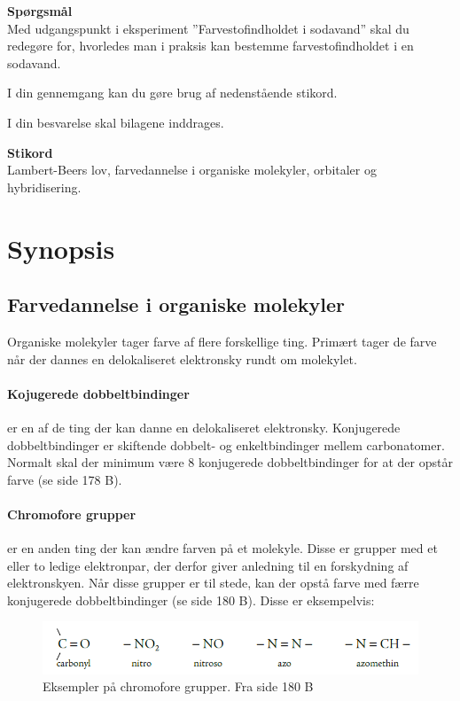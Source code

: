 \textbf{Spørgsmål}\\
Med udgangspunkt i eksperiment ”Farvestofindholdet i sodavand” skal du redegøre for, hvorledes man i praksis kan bestemme farvestofindholdet i en sodavand. 

I din gennemgang kan du gøre brug af nedenstående stikord. 

I din besvarelse skal bilagene inddrages.


\vspace{0.5 cm}
\textbf{Stikord}\\
Lambert-Beers lov, farvedannelse i organiske molekyler, orbitaler og hybridisering.

\section*{Synopsis}

\subsection{Farvedannelse i organiske molekyler}
Organiske molekyler tager farve af flere forskellige ting.
Primært tager de farve når der dannes en delokaliseret elektronsky rundt om molekylet. 

\paragraph{Kojugerede dobbeltbindinger} er en af de ting der kan danne en delokaliseret elektronsky. 
Konjugerede dobbeltbindinger er skiftende dobbelt- og enkeltbindinger mellem carbonatomer. 
Normalt skal der minimum være 8 konjugerede dobbeltbindinger for at der opstår farve (se side 178 B).

\paragraph{Chromofore grupper} er en anden ting der kan ændre farven på et molekyle. 
Disse er grupper med et eller to ledige elektronpar, der derfor giver anledning til en forskydning af elektronskyen. 
Når disse grupper er til stede, kan der opstå farve med færre konjugerede dobbeltbindinger (se side 180 B).
Disse er eksempelvis:
\begin{figure}[h]
    \centering
    \includegraphics[scale=0.7]{Figurer/chromoforeGrupper}
    \caption{Eksempler på chromofore grupper. Fra side 180 B}
\end{figure}


